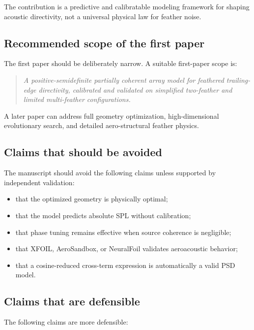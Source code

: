 \documentclass[11pt]{article}
\begin{document}
The contribution is a predictive and calibratable modeling framework for shaping acoustic directivity, not a universal physical law for feather noise.

\subsection{Recommended scope of the first paper}

The first paper should be deliberately narrow. A suitable first-paper scope is:

\begin{quote}
\emph{
A positive-semidefinite partially coherent array model for feathered trailing-edge directivity, calibrated and validated on simplified two-feather and limited multi-feather configurations.
}
\end{quote}

A later paper can address full geometry optimization, high-dimensional evolutionary search, and detailed aero-structural feather physics.

\subsection{Claims that should be avoided}

The manuscript should avoid the following claims unless supported by independent validation:

\begin{itemize}
    \item that the optimized geometry is physically optimal;
    \item that the model predicts absolute SPL without calibration;
    \item that phase tuning remains effective when source coherence is negligible;
    \item that XFOIL, AeroSandbox, or NeuralFoil validates aeroacoustic behavior;
    \item that a cosine-reduced cross-term expression is automatically a valid PSD model.
\end{itemize}

\subsection{Claims that are defensible}

The following claims are more defensible:
\end{document}
